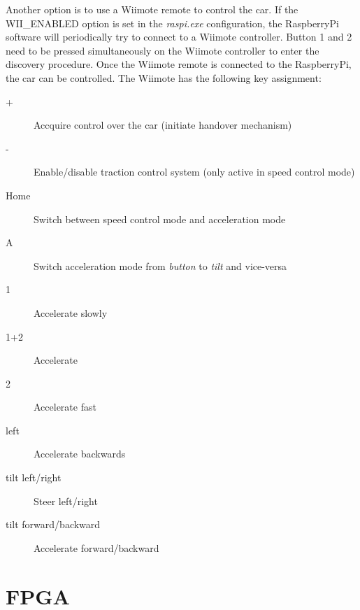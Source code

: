\documentclass[a4paper
               ,10pt
               ,DIV=10 %
               ,BCOR=0.3cm
               ,pagesize %
               ,headings=small
               ,bibtotoc
               ]
               {scrartcl}
\begin{document}
Another option is to use a Wiimote remote to control the car. If the WII\_ENABLED option is set in the \textit{raspi.exe} configuration, the RaspberryPi software will periodically try to connect to a Wiimote controller.
Button 1 and 2 need to be pressed simultaneously on the Wiimote controller to enter the discovery procedure.
Once the Wiimote remote is connected to the RaspberryPi, the car can be controlled.
The Wiimote has the following key assignment:
\begin{description}
\item[+] Accquire control over the car (initiate handover mechanism)
\item[-] Enable/disable traction control system (only active in speed control mode)
\item[Home] Switch between speed control mode and acceleration mode
\item[A] Switch acceleration mode from \textit{button} to \textit{tilt} and vice-versa
\item[1] Accelerate slowly
\item[1+2] Accelerate
\item[2] Accelerate fast
\item[left] Accelerate backwards
\item[tilt left/right] Steer left/right
\item[tilt forward/backward] Accelerate forward/backward
\end{description}


\section{FPGA}
\end{document}
